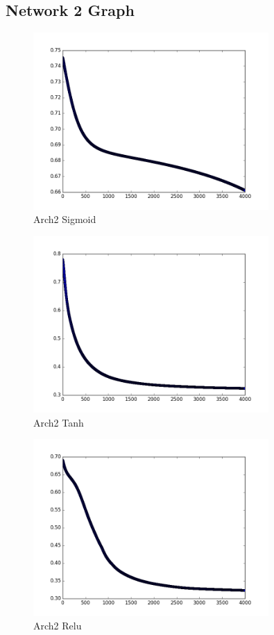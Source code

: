 \documentclass{article}
\begin{document}
\subsection{Network 2 Graph}
\begin{figure}[H]
  \caption{Arch2 Sigmoid}
  \centering
  \includegraphics[width=0.8\textwidth]{arch2sigmoid}
\end{figure}
\begin{figure}[H]
  \caption{Arch2 Tanh}
  \centering
  \includegraphics[width=0.8\textwidth]{arch2tanh}
\end{figure}
\begin{figure}[H]
  \caption{Arch2 Relu}
  \centering
  \includegraphics[width=0.8\textwidth]{arch2relu}
\end{figure}
\end{document}
